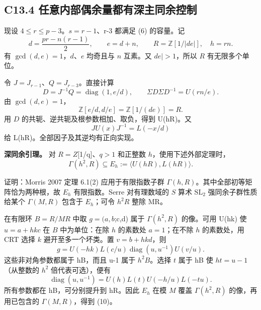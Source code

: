 \subsection*{\texorpdfstring{{C13.4} {任意内部偶余量都有深主同余控制}}{C13.4 任意内部偶余量都有深主同余控制}}\label{C13-h91}

{现设} {\ensuremath{4\le r\le p-3}。\ensuremath{s=r-1}、r-3} {都满足} {(6)} {的容量。记} \[
d=\frac{pr-n(r-1)}2,\qquad e=d+n,\qquad
R=\mathbb Z[1/|de|],\quad h=rn.
\] {有} {\ensuremath{\operatorname{gcd}(d,e)=1}，\ensuremath{d}、\ensuremath{e}} {均奇且与} {\ensuremath{n}} {互素。又} {\textbar{}\ensuremath{de|>1}，所以} {\ensuremath{R}} {有无限多个单位。}

{令} {\ensuremath{J=J_{r-1}}、\ensuremath{Q=J_{r-3}}。直接计算} \[
D=J^{-1}Q=\operatorname{diag}(1,e/d),\qquad
\Sigma D\Sigma D^{-1}=U(rn/e).
\tag{C13.9}
\] {由} {\ensuremath{\operatorname{gcd}(d,e)=1}，} \[
\mathbb Z[e/d,d/e]=\mathbb Z[1/(de)]=R.
\] {用} {\ensuremath{D}} {的共轭、逆共轭及根参数相加、取负，得到} {U(hR)。又} \[
JU(x)J^{-1}=L(-x/d)
\] {给} {L(hR)。全部因子及其逆均有正向实现。}

\textbf{{深同余引理。}} {对} {\ensuremath{R=Z}{[}1/q{]}、\ensuremath{q>1}} {和正整数} {\ensuremath{h}，使用下述外部定理时，} \[
\boxed{\Gamma(h^2,R)\subseteq
E_h:=\langle U(hR),L(hR)\rangle.}
\tag{C13.10}
\]

{证明：Morris} {2007} {定理} {6.1(2)} {应用于有限指数子群} {\ensuremath{\Gamma (h,R)}。其中全部初等矩阵恰为两种根，故} {\ensuremath{E_{h}}} {有限指数。Serre} {对有理数域的} {\ensuremath{S}} {算术} {\ensuremath{\mathrm{SL}_{2}}} {强同余子群性质给某个} {\ensuremath{\Gamma (M,R)}} {包含于} {\ensuremath{E_{h}}；可令} {\ensuremath{h^{2}R}} {整除} {MR。}

{在有限环} {\ensuremath{B=R/MR}} {中取} {\ensuremath{g=(a,b};c,d)} {属于} {\ensuremath{\Gamma (h^{2},R)}} {的像。可用} {U(hk)} {使} {\ensuremath{u=a+hkc}} {在} {\ensuremath{B}} {中为单位：在除} {\ensuremath{h}} {的素数处} {\ensuremath{a=1}；在不除} {\ensuremath{h}} {的素数处，用} {CRT} {选择} {\ensuremath{k}} {避开至多一个坏类。置} {\ensuremath{v=b+hkd}，则} \[
g=U(-hk)L(c/u)\operatorname{diag}(u,u^{-1})U(v/u).
\] {这些非对角参数都属于} {hB，而且} {u-1} {属于} {\ensuremath{h^{2}B}。选择} {\ensuremath{t}} {属于} {hB} {使} {\ensuremath{ht=u-1}（从整数的} {\ensuremath{h^{2}}} {倍代表可选），便有} \[
\operatorname{diag}(u,u^{-1})
=U(h)L(t)U(-h/u)L(-tu).
\tag{C13.11}
\] {所有参数都在} {hB，可分别提升到} {hR。因此} {\ensuremath{E_{h}}} {在模} {\ensuremath{M}} {覆盖} {\ensuremath{\Gamma (h^{2},R)}} {的像，再用已包含的} {\ensuremath{\Gamma (M,R)}，得到} {(10)。}

